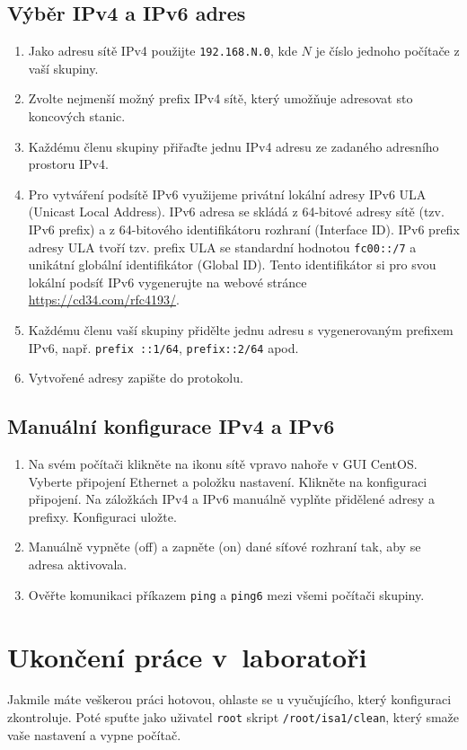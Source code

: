 \documentclass[a4paper,11pt]{article}
\begin{document}
\subsection{Výběr IPv4 a IPv6 adres}
\begin{enumerate}
    \item Jako adresu sítě IPv4 použijte \texttt{192.168.N.0}, kde $N$ je číslo jednoho počítače z vaší skupiny. 
    \item Zvolte nejmenší možný prefix IPv4 sítě, který umožňuje adresovat sto koncových stanic.
    \item Každému členu skupiny přiřaďte jednu IPv4 adresu ze zadaného adresního prostoru IPv4.
    \item Pro vytváření podsítě IPv6 využijeme privátní lokální adresy IPv6 ULA (Unicast Local Address). IPv6 adresa se skládá z 64-bitové adresy sítě (tzv. IPv6 prefix) a z 64-bitového identifikátoru rozhraní (Interface ID). IPv6 prefix adresy ULA tvoří tzv. prefix ULA se standardní hodnotou {\tt fc00::/7} a unikátní globální identifikátor (Global ID). Tento identifikátor si pro svou lokální podsíť IPv6 vygenerujte  na webové stránce \url{https://cd34.com/rfc4193/}.
    \item Každému členu vaší skupiny přidělte jednu adresu s vygenerovaným prefixem IPv6, např. {\tt prefix ::1/64}, {\tt prefix::2/64} apod.
    \item Vytvořené adresy zapište do protokolu.
\end{enumerate}

\subsection{Manuální konfigurace IPv4 a IPv6}

\begin{enumerate}
    \item Na svém počítači klikněte na ikonu sítě vpravo nahoře v GUI CentOS. Vyberte připojení Ethernet a položku nastavení.
      Klikněte na konfiguraci připojení. Na záložkách IPv4 a IPv6  manuálně vyplňte přidělené adresy a prefixy. Konfiguraci uložte.
    \item Manuálně vypněte (off) a zapněte (on) dané síťové rozhraní tak, aby se adresa aktivovala. 
    \item Ověřte komunikaci příkazem {\tt ping} a {\tt ping6} mezi všemi počítači skupiny.
\end{enumerate}

\section{Ukončení práce v~laboratoři}
Jakmile máte veškerou práci hotovou, ohlaste se u vyučujícího, který konfiguraci zkontroluje. Poté spuťte jako uživatel {\tt root} skript {\tt /root/isa1/clean}, který smaže vaše nastavení a vypne počítač.
\end{document}
